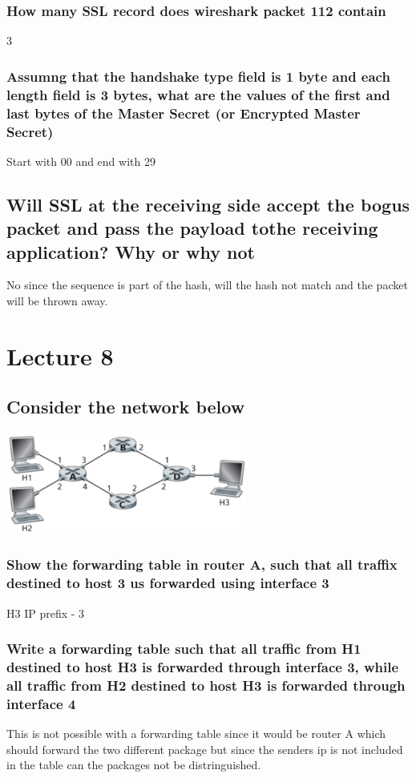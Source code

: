 \documentclass[12pt, a4paper]{article}
\begin{document}
			\subsubsection{How many SSL record does wireshark packet 112 contain}
				3
			\subsubsection{Assumng that the handshake type field is 1 byte and each length field is 3 bytes, what are the values of the first and last bytes of the Master Secret (or Encrypted Master Secret)}
				Start with 00 and end with 29
		\subsection{Will SSL at the receiving side accept the bogus packet and pass the payload tothe receiving application? Why or why not}
			No since the sequence is part of the hash, will the hash not match and the packet will be thrown away.
	\setcounter{section}{7}
	\section{Lecture 8}
		\subsection{Consider the network below}
			\includegraphics[width=300px]{assets/7.1.png}
			\subsubsection{Show the forwarding table in router A, such that all traffix destined to host 3 us forwarded using interface 3}
				H3 IP prefix - 3\\
			\subsubsection{Write a forwarding table such that all traffic from H1 destined to host H3 is forwarded through interface 3, while all traffic from H2 destined to host H3 is forwarded through interface 4}
				This is not possible with a forwarding table since it would be router A which should forward the two different package but since the senders ip is not included in the table can the packages not be distringuished.
\end{document}
